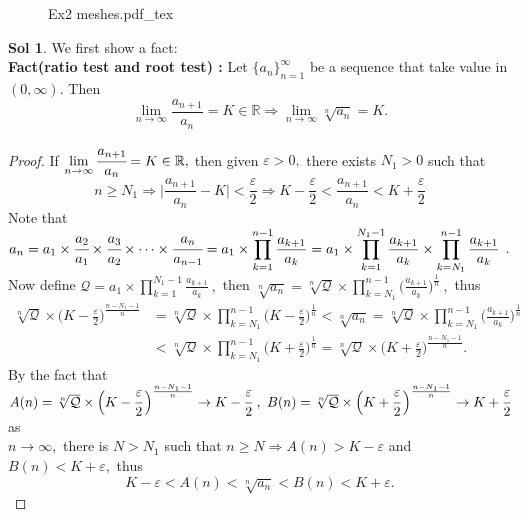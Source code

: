 \documentclass[12pt,a4paper]{report}
\theoremstyle{definition}
\newtheorem*{sol}{Sol}
\newcommand{\incfig}[1]{%
{#1.pdf_tex}
}
\begin{document}
	\begin{figure}[htp]
	\centering
	\def\svgwidth{15cm}
	\incfig{Ex2 meshes}
	\end{figure}
	\begin{sol} We first show a fact:\\ 
	\textbf{Fact(ratio test and root test) :} Let $\{a_n\}_{n=1}^\infty$ be a sequence that take value in $(0,\infty).$ Then
	\[
	\lim_{n\to\infty}\frac{a_{n+1}}{a_n}=K\in\mathbb{R}\Rightarrow \lim_{n\to\infty}\sqrt[n]{a_n}=K.
	\]
	\begin{proof}
	If $\lim\limits_{n\to\infty}\cfrac{a_{n+1}}{a_n}=K\in\mathbb{R},$ then given $\varepsilon>0,$ there exists $N_1>0$ such that 
	\[
    	n\geq N_1\Rightarrow \Big|\frac{a_{n+1}}{a_n}-K\Big|<\frac{\varepsilon}{2}\Rightarrow K-\frac{\varepsilon}{2}<\frac{a_{n+1}}{a_n}<K+\frac{\varepsilon}{2}
	\]
	Note that $a_n=a_1\times \cfrac{a_2}{a_1}\times \cfrac{a_3}{a_2}\times \cdots \times \cfrac{a_n}{a_{n-1}}=a_1\times{\displaystyle \prod_{k=1}^{n-1} \frac{a_{k+1}}{a_k}}=a_1\times{\displaystyle \prod_{k=1}^{N_1-1} \frac{a_{k+1}}{a_k}}\times{\displaystyle \prod_{k=N_1}^{n-1} \frac{a_{k+1}}{a_k}}$ . \\
	Now define $\mathcal{Q}=a_1\times{\displaystyle \prod_{k=1}^{N_1-1} \frac{a_{k+1}}{a_k}}\ ,$ then $\sqrt[n]{a_n}=\sqrt[n]{\mathcal{Q}}\times {\displaystyle \prod_{k=N_1}^{n-1} \Big(\frac{a_{k+1}}{a_k}\Big)^{\frac{1}{n}}}\ , $ thus
	\begin{align*}
	    	\sqrt[n]{\mathcal{Q}}\times\Big(K-\frac{\varepsilon}{2}\Big)^{\frac{n-N_1-1}{n}}&= \sqrt[n]{\mathcal{Q}}\times{\displaystyle \prod_{k=N_1}^{n-1}\Big(K-\frac{\varepsilon}{2}\Big)^{\frac{1}{n}}}<\sqrt[n]{a_n}=\sqrt[n]{\mathcal{Q}}\times {\displaystyle \prod_{k=N_1}^{n-1} \Big(\frac{a_{k+1}}{a_k}\Big)^{\frac{1}{n}}}\\
	    	&<\sqrt[n]{\mathcal{Q}}\times{\displaystyle \prod_{k=N_1}^{n-1}\Big(K+\frac{\varepsilon}{2}\Big)^{\frac{1}{n}}}=\sqrt[n]{\mathcal{Q}}\times\Big(K+\frac{\varepsilon}{2}\Big)^{\frac{n-N_1-1}{n}}.
	\end{align*}
	By the fact that \\
	$A(n)=\sqrt[n]{\mathcal{Q}}\times\Big(K-\cfrac{\varepsilon}{2}\,\Big)^{\frac{n-N_1-1}{n}}\to K-\cfrac{\varepsilon}{2}\ ,\ B(n)=\sqrt[n]{\mathcal{Q}}\times\Big(K+\cfrac{\varepsilon}{2}\,\Big)^{\frac{n-N_1-1}{n}}\to K+\cfrac{\varepsilon}{2} $ as\\[3pt] $n\to\infty,$ there is $N>N_1$ such that $n\geq N\Rightarrow A(n)>K-\varepsilon$ and $B(n)<K+\varepsilon,$ thus 
	\[
	K-\varepsilon<A(n)<\sqrt[n]{a_n}<B(n)<K+\varepsilon.
\]
\end{proof}
\end{sol}
\end{document}
